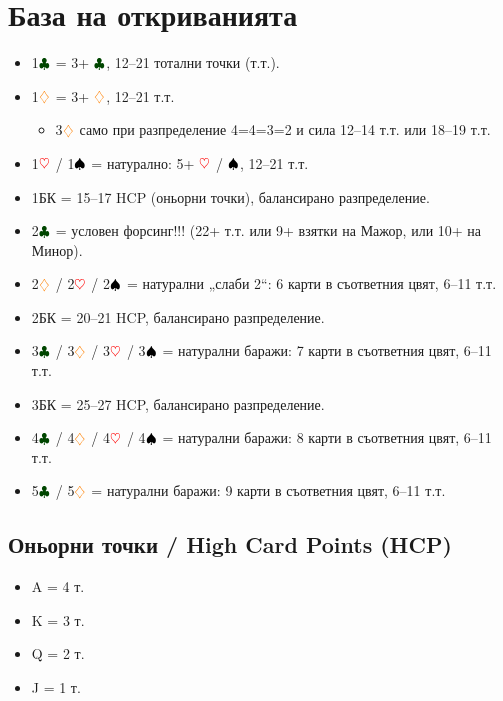 \documentclass[10pt,a5paper]{extarticle}
\newcommand{\Rheart}{\textcolor{red}{\heartsuit}}
\newcommand{\Rdiamond}{\textcolor{orange}{\diamondsuit}}
\newcommand{\Bspade}{\textcolor{black}{\spadesuit}}
\newcommand{\Bclub}{\textcolor{darkgreen}{\clubsuit}}
\begin{document}
\vspace{1em}


\section*{База на откриванията}

\begin{itemize}
    \item[] 1$\Bclub$ = 3+ $\Bclub$, 12–21 тотални точки (т.т.).
    \item[] 1$\Rdiamond$ = 3+ $\Rdiamond$, 12–21 т.т. 
        \begin{itemize}
            \item[] 3$\Rdiamond$ само при разпределение 4=4=3=2 и сила 12–14 т.т. или 18–19 т.т.
        \end{itemize}
    \item[] 1$\Rheart$ / 1$\Bspade$ = натурално: 5+ $\Rheart$ / $\Bspade$, 12–21 т.т.
    \item[] 1БК = 15–17 HCP (оньорни точки), балансирано разпределение.
    \item[] 2$\Bclub$ = условен форсинг!!! (22+ т.т. или 9+ взятки на Мажор, или 10+ на Минор).
    \item[] 2$\Rdiamond$ / 2$\Rheart$ / 2$\Bspade$ = натурални „слаби 2“: 6 карти в съответния цвят, 6–11 т.т.
    \item[] 2БК = 20–21 HCP, балансирано разпределение.
    \item[] 3$\Bclub$ / 3$\Rdiamond$ / 3$\Rheart$ / 3$\Bspade$ = натурални баражи: 7 карти в съответния цвят, 6–11 т.т.
    \item[] 3БК = 25–27 HCP, балансирано разпределение.
    \item[] 4$\Bclub$ / 4$\Rdiamond$ / 4$\Rheart$ / 4$\Bspade$ = натурални баражи: 8 карти в съответния цвят, 6–11 т.т.
    \item[] 5$\Bclub$ / 5$\Rdiamond$ = натурални баражи: 9 карти в съответния цвят, 6–11 т.т.
\end{itemize}

\subsection*{Оньорни точки / High Card Points (HCP)}
\begin{itemize}
    \item[] A = 4 т.
    \item[] K = 3 т.
    \item[] Q = 2 т.
    \item[] J = 1 т.
\end{itemize}
\end{document}
